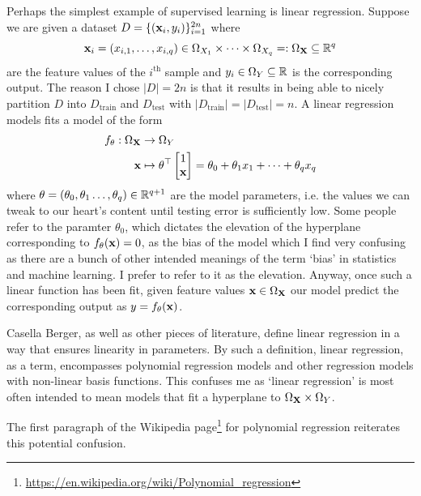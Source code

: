 \documentclass[11pt]{article}
\begin{document}
Perhaps the simplest example of supervised learning is linear regression. Suppose we are given a dataset $D=\{(\mathbf{x}_i,y_i)\}_{i=1}^{2n}$ where
$$
\mathbf{x}_i=(x_{i,1},\dots,x_{i, q})\in \Omega_{X_1}\times\dots\times \Omega_{X_q}=:\Omega_{\mathbf{X}}\subseteq\mathbb{R}^q
$$
are the feature values of the $i^{\text{th}}$ sample and $y_i\in \Omega_{Y}\subseteq\mathbb{R}$ is the corresponding output. The reason I chose $|D|=2n$ is that it results in being able to nicely partition $D$ into $D_{\text{train}}$ and $D_{\text{test}}$ with $|D_{\text{train}}|=|D_{\text{test}}|=n$. A linear regression models fits a model of the form
\begin{align*}
    f_{\theta}:\Omega_{\mathbf{X}}&\rightarrow \Omega_Y\\
    \mathbf{x}&\mapsto
    \theta^{\top}
    \begin{bmatrix}
        1\\
        \mathbf{x}
    \end{bmatrix}
    =
    \theta_0+\theta_1x_1+\dots+\theta_qx_q    
\end{align*}
where $\theta=(\theta_0,\theta_1\dots,\theta_q)\in\mathbb{R}^{q+1}$ are the model parameters, i.e. the values we can tweak to our heart's content until testing error is sufficiently low. Some people refer to the paramter $\theta_0$, which dictates the elevation of the hyperplane corresponding to $f_{\theta}(\mathbf{x})=0$, as the bias of the model which I find very confusing as there are a bunch of other intended meanings of the term `bias' in statistics and machine learning. I prefer to refer to it as the elevation. Anyway, once such a linear function has been fit, given feature values $\mathbf{x}\in\Omega_{\mathbf{X}}$ our model predict the corresponding output as $y=f_{\theta}(\mathbf{x})$.

\begin{tcolorbox}[title={\centering\textbf{What does the `linear' in linear regression actually refer to?}}, colback=myLightBlue, colbacktitle=myDarkBlue, colframe=myDarkBlue, coltitle=white]
    Casella Berger, as well as other pieces of literature, define linear regression in a way that ensures linearity in parameters. By such a definition, linear regression, as a term, encompasses polynomial regression models and other regression models with non-linear basis functions. This confuses me as `linear regression' is most often intended to mean models that fit a hyperplane to $\Omega_{\mathbf{X}}\times\Omega_Y$.
    
    \hspace{14.52pt} The first paragraph of the Wikipedia page\footnote{\url{https://en.wikipedia.org/wiki/Polynomial_regression}} for polynomial regression reiterates this potential confusion.
\end{tcolorbox}
\end{document}
